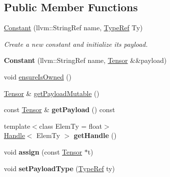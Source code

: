 \subsection*{Public Member Functions}
\begin{DoxyCompactItemize}
\item 
\mbox{\label{classglow_1_1_constant_ad7216d16fbe01db6b670810030c15f41}} 
\hyperlink{classglow_1_1_constant_ad7216d16fbe01db6b670810030c15f41}{Constant} (llvm\+::\+String\+Ref name, \hyperlink{structglow_1_1_type}{Type\+Ref} Ty)
\begin{DoxyCompactList}\small\item\em Create a new constant and initialize its payload. \end{DoxyCompactList}\item 
\mbox{\label{classglow_1_1_constant_a0d68ae25dda3b3656ee75de1b257deb8}} 
{\bfseries Constant} (llvm\+::\+String\+Ref name, \hyperlink{classglow_1_1_tensor}{Tensor} \&\&payload)
\item 
void \hyperlink{classglow_1_1_constant_ae0b1b3aecc549a9f9885558753391500}{ensure\+Is\+Owned} ()
\item 
\hyperlink{classglow_1_1_tensor}{Tensor} \& \hyperlink{classglow_1_1_constant_ace7a74284d69823f398ad069fce905c1}{get\+Payload\+Mutable} ()
\item 
\mbox{\label{classglow_1_1_constant_a7c900e473c6eb18d909454f76fdf48fd}} 
const \hyperlink{classglow_1_1_tensor}{Tensor} \& {\bfseries get\+Payload} () const
\item 
\mbox{\label{classglow_1_1_constant_a630e2ce5e9cf5e186cb25d08948bc280}} 
{\footnotesize template$<$class Elem\+Ty  = float$>$ }\\\hyperlink{classglow_1_1_handle}{Handle}$<$ Elem\+Ty $>$ {\bfseries get\+Handle} ()
\item 
\mbox{\label{classglow_1_1_constant_a591b9e635e497399b0267acf58f5d987}} 
void {\bfseries assign} (const \hyperlink{classglow_1_1_tensor}{Tensor} $\ast$t)
\item 
\mbox{\label{classglow_1_1_constant_a3b6a6d9c829e4ee04c547b3cffa2db1b}} 
void {\bfseries set\+Payload\+Type} (\hyperlink{structglow_1_1_type}{Type\+Ref} ty)

\end{DoxyCompactItemize}
